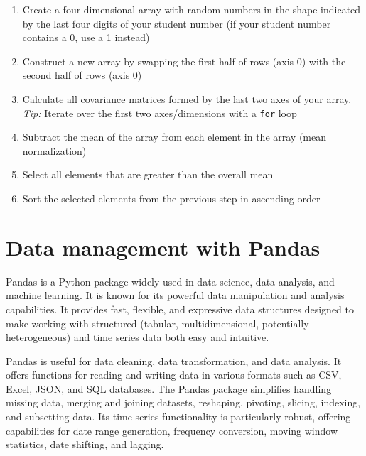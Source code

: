 

\begin{exercisebox}
\begin{enumerate}
   \item Create a four-dimensional array with random numbers in the shape indicated by the last four digits of your student number (if your student number contains a 0, use a 1 instead)
   \item Construct a new array by swapping the first half of rows (axis 0) with the second half of rows (axis 0)
   \item Calculate all covariance matrices formed by the last two axes of your array. \emph{Tip:} Iterate over the first two axes/dimensions with a \texttt{for} loop
   \item Subtract the mean of the array from each element in the array (mean normalization)
   \item Select all elements that are greater than the overall mean
   \item Sort the selected elements from the previous step in ascending order
\end{enumerate}
\end{exercisebox}

\section{Data management with Pandas}

Pandas is a Python package widely used in data science, data analysis, and machine learning. It is known for its powerful data manipulation and analysis capabilities. It provides fast, flexible, and expressive data structures designed to make working with structured (tabular, multidimensional, potentially heterogeneous) and time series data both easy and intuitive. 

Pandas is useful for data cleaning, data transformation, and data analysis. It offers functions for reading and writing data in various formats such as CSV, Excel, JSON, and SQL databases. The Pandas package simplifies handling missing data, merging and joining datasets, reshaping, pivoting, slicing, indexing, and subsetting data. Its time series functionality is particularly robust, offering capabilities for date range generation, frequency conversion, moving window statistics, date shifting, and lagging.

